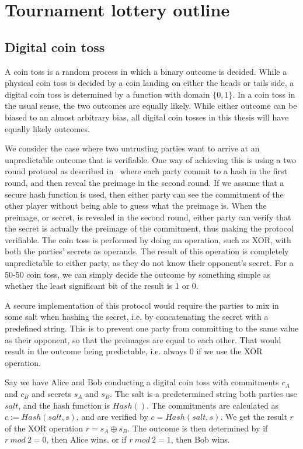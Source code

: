 \section{Tournament lottery outline}
\label{sec:outline}

\subsection{Digital coin toss}

A coin toss is a random process in which a binary outcome is decided. While a physical coin toss is decided by a coin landing on either the heads or tails side, a digital coin toss is determined by a function with domain $\{0, 1\}$. In a coin toss in the usual sense, the two outcomes are equally likely. While either outcome can be biased to an almost arbitrary bias, all digital coin tosses in this thesis will have equally likely outcomes.

We consider the case where two untrusting parties want to arrive at an unpredictable outcome that is verifiable. One way of achieving this is using a two round protocol as described in~\cite{blum1983coin} where each party commit to a hash in the first round, and then reveal the preimage in the second round. If we assume that a secure hash function is used, then either party can see the commitment of the other player without being able to guess what the preimage is. When the preimage, or secret, is revealed in the second round, either party can verify that the secret is actually the preimage of the commitment, thus making the protocol verifiable. The coin toss is performed by doing an operation, such as XOR, with both the parties' secrets as operands. The result of this operation is completely unpredictable to either party, as they do not know their opponent's secret. For a 50-50 coin toss, we can simply decide the outcome by something simple as whether the least significant bit of the result is 1 or 0.

A secure implementation of this protocol would require the parties to mix in some salt when hashing the secret, i.e. by concatenating the secret with a predefined string. This is to prevent one party from committing to the same value as their opponent, so that the preimages are equal to each other. That would result in the outcome being predictable, i.e. always $0$ if we use the XOR operation. 

Say we have Alice and Bob conducting a digital coin toss with commitments $c_A$ and $c_B$ and secrets $s_A$ and $s_B$. The salt is a predetermined string both parties use $salt$, and the hash function is $Hash()$. The commitments are calculated as $c:=Hash(salt, s)$, and are verified by $c=Hash(salt, s)$. We get the result $r$ of the XOR operation $r=s_A \oplus s_B$. The outcome is then determined by if $r\ mod\ 2 = 0$, then Alice wins, or if $r\ mod\ 2 = 1$, then Bob wins.

